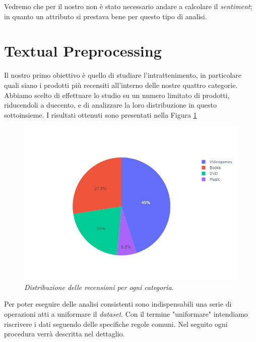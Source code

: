 		Vedremo che per il nostro non è stato necessario andare a calcolare il \textit{sentiment}; in quanto un attributo si prestava bene per questo tipo di analisi.
		
	\section{Textual Preprocessing}
		Il nostro primo obiettivo è quello di studiare l'intrattenimento, in particolare quali siano i prodotti più recensiti all'interno delle nostre quattro categorie. Abbiamo scelto di effettuare lo studio su un numero limitato di prodotti, riducendoli a duecento, e di analizzare la loro distribuzione in questo sottoinsieme. I risultati ottenuti sono presentati nella Figura \ref{fig:pie_category}
		
		\begin{figure} [h]
			\includegraphics[width=\textwidth]{Figure/pie_category}
			\caption{\textit{Distribuzione delle recensioni per ogni categoria}.}
			\label{fig:pie_category}
		\end{figure}
	
		Per poter eseguire delle analisi consistenti sono indispensabili una serie di operazioni atti a uniformare il \textit{dataset}. Con il termine "uniformare" intendiamo riscrivere i dati seguendo delle specifiche regole comuni. Nel seguito ogni procedura verrà descritta nel dettaglio.
		
		
		